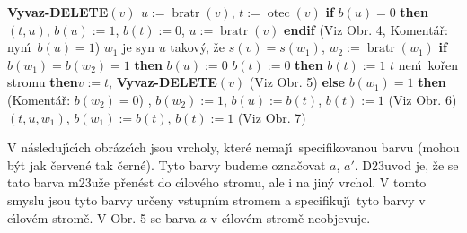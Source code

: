 \documentclass[a4paper,12pt]{article}
\DeclareMathOperator*{\otec}{otec}
\DeclareMathOperator*{\bratr}{bratr}
\begin{document}
{\bf Vyvaz-DELETE$(v)$\newline 
$u:=\bratr(v)$}, $t:=\otec(v)$\newline 
{\bf if} $b(u)=0$ {\bf then}\newline 
\phantom{---}{\bf Rotace}$(t,u)$, $b(u):=1$, $b(t):=0$, $u:=\bratr(v)$\newline 
{\bf endif\newline}
(Viz Obr. 4, Koment\'a\v r: nyn\'\i\ $b(u)=1$)\newline 
$w_1$ je syn $u$ takov\'y, \v ze $s(v)=s(w_1)$, $w_2:=\bratr(w_1)$\newline 
{\bf if} $b(w_1)=b(w_2)=1$ {\bf then}\newline 
\phantom{---}$b(u):=0$\newline 
\phantom{---}{\bf if} $b(t):=0$ {\bf then}\newline 
\phantom{------}$b(t):=1$\newline 
\phantom{---}{\bf else}\newline 
\phantom{------}{\bf if} $t$ nen\'\i\ ko\v ren stromu {\bf then}\newline \phantom{---------}$v:=t$, {\bf Vyvaz-DELETE}$(v)$\newline 
\phantom{------}{\bf endif}\newline 
\phantom{---}{\bf endif} (Viz Obr. 5)\newline 
{\bf else}\newline 
\phantom{---}{\bf if} $b(w_1)=1$ {\bf then}\newline 
(Koment\'a\v r: $b(w_2)=0$)\newline 
\phantom{------}{\bf Rotace$(t,u)$}, $b(w_2):=1$, $b(u):=b(t)$, $b(t):=1$ (Viz Obr. 6)\newline 
\phantom{---}{\bf else}\newline 
\phantom{------}{\bf Dvojita-rotace}$(t,u,w_1)$, $b(w_1):=b(t)$, $b(t):=1$ (Viz Obr. 7)\newline
\phantom{---}{\bf endif\newline 
endif}
\bigskip

\flushpar V n\'asleduj\'\i c\'\i ch obr\'azc\'\i ch jsou vrcholy, kter\'e 
nemaj\'\i\ specifikovanou barvu (mohou b\'yt jak \v cerven\'e tak \v cern\'e).
Tyto barvy budeme ozna\v covat $a$, $a'$. D\accent23uvod je, \v ze se 
tato barva m\accent23u\v ze p\v ren\'est do c\'\i lov\'eho stromu, ale 
i na jin\'y vrchol. V tomto smyslu jsou tyto barvy ur\v ceny vstupn\'\i m 
stromem a specifikuj\'\i\ tyto barvy v c\'\i lov\'em strom\v e. V Obr. 5 
se barva $a$ v c\'\i lov\'em strom\v e neobjevuje.
\medskip
\end{document}
